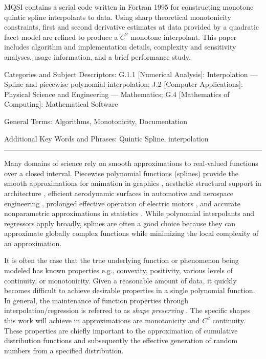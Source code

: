 {\rmVIII\parindent=0pt MQSI contains a serial code written in Fortran
  1995 for constructing monotone quintic spline interpolants to
  data. Using sharp theoretical monotonicity constraints, first and
  second derivative estimates at data provided by a quadratic facet
  model are refined to produce a $C^2$ monotone interpolant. This
  paper includes algorithm and implementation details, complexity and
  sensitivity analyses, usage information, and a brief performance
  study.

\medskip
Categories and Subject Descriptors: G.1.1 [{\bfVIII Numerical Analysis}]:
Interpolation --- Spline and piecewise polynomial interpolation;
J.2 [{\bfVIII Computer Applications}]: Physical Science and Engineering
--- {\itVIII Mathematics};
G.4 [{\bfVIII Mathematics of Computing}]: Mathematical Software

\medskip
General Terms: Algorithms, Monotonicity, Documentation

\medskip
Additional Key Words and Phrases: Quintic Spline, interpolation

}

\bigskip\hrule\bigskip\medskip
{}


Many domains of science rely on smooth approximations to real-valued
functions over a closed interval. Piecewise polynomial functions
(splines) provide the smooth approximations for animation in graphics
\cite{herman2015techniques,quint2003scalable}, aesthetic structural
support in architecture \cite{brennan2019measure}, efficient
aerodynamic surfaces in automotive and aerospace engineering
\cite{brennan2019measure}, prolonged effective operation of electric
motors \cite{berglund2009planning}, and accurate nonparametric
approximations in statistics \cite{knott2012interpolating}. While
polynomial interpolants and regressors apply broadly, splines are
often a good choice because they can approximate globally complex
functions while minimizing the local complexity of an approximation.

It is often the case that the true underlying function or phenomenon
being modeled has known properties e.g., convexity, positivity,
various levels of continuity, or monotonicity. Given a reasonable
amount of data, it quickly becomes difficult to achieve desirable
properties in a single polynomial function. In general, the
maintenance of function properties through interpolation/regression is
referred to as {\it shape preserving}
\cite{fritsch1980monotone,gregory1985shape}. The specific shapes this
work will achieve in approximations are monotonicity and $C^2$
continuity. These properties are chiefly important to the
approximation of cumulative distribution functions and subsequently
the effective generation of random numbers from a specified
distribution.

